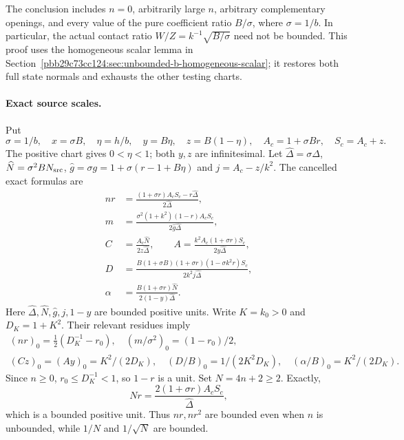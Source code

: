 The conclusion includes $n=0$, arbitrarily large $n$, arbitrary
complementary openings, and every value of the pure coefficient
ratio $B/\sigma$, where $\sigma=1/b$.  In particular, the actual
contact ratio $W/Z=k^{-1}\sqrt{B/\sigma}$ need not be bounded.
This proof uses the homogeneous scalar lemma in
Section~\ref{pbb29c73cc124:sec:unbounded-b-homogeneous-scalar}; it restores both
full state normals and exhausts the other testing charts.

\paragraph{Exact source scales.}
Put
\[
 \sigma=1/b,\quad x=\sigma B,\quad \eta=h/b,\quad
 y=B\eta,\quad z=B(1-\eta),\quad
 A_c=1+\sigma Br,\quad S_c=A_c+z.
\]
The positive chart gives $0<\eta<1$; both $y,z$ are infinitesimal.
Let $\widehat\Delta=\sigma\Delta$,
$\widehat N=\sigma^2 B N_{\rm src}$,
$\widehat g=\sigma g=1+\sigma(r-1+B\eta)$ and
$j=A_c-z/k^2$.  The cancelled exact formulas are
\begin{align*}
 nr&=\frac{(1+\sigma r)A_cS_c-r\widehat\Delta}
                       {2\widehat\Delta},\\
 m&=\frac{\sigma^2(1+k^2)(1-r)A_cS_c}
                       {2\widehat g\widehat\Delta},\\
 C&=\frac{A_c\widehat N}{2z\widehat\Delta},\qquad
 A=\frac{k^2A_c(1+\sigma r)S_c}{2y\widehat\Delta},\\
 D&=\frac{B(1+\sigma B)(1+\sigma r)(1-\sigma k^2r)S_c}
                       {2k^2j\widehat\Delta},\\
 \alpha&=\frac{B(1+\sigma r)\widehat N}
                       {2(1-y)\widehat\Delta}.
                                                               \tag{UB1}
\end{align*}
Here $\widehat\Delta,\widehat N,\widehat g,j,1-y$ are bounded
positive units.  Write $K=k_0>0$ and $D_K=1+K^2$.  Their relevant
residues imply
\begin{gather*}
 (nr)_0=\tfrac12(D_K^{-1}-r_0),\quad
 (m/\sigma^2)_0=(1-r_0)/2,\\
 (Cz)_0=(Ay)_0=K^2/(2D_K),\quad
 (D/B)_0=1/(2K^2D_K),\quad
 (\alpha/B)_0=K^2/(2D_K).                            \tag{UB2}
\end{gather*}
Since $n\geq0$, $r_0\leq D_K^{-1}<1$, so $1-r$ is a unit.
Set $N=4n+2\geq2$.  Exactly,
\[
 Nr=\frac{2(1+\sigma r)A_cS_c}{\widehat\Delta},      \tag{UB3}
\]
which is a bounded positive unit.  Thus $nr,nr^2$ are bounded even
when $n$ is unbounded, while $1/N$ and $1/\sqrt N$ are bounded.


